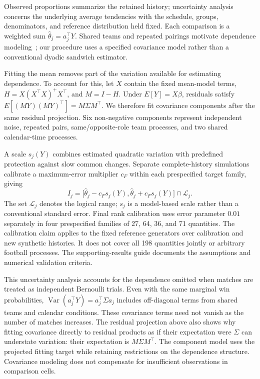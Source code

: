 Observed proportions summarize the retained history; uncertainty analysis concerns the underlying average tendencies with the schedule, groups, denominators, and reference distribution held fixed. Each comparison is a weighted sum $\widehat\theta_j=a_j^\top Y$. Shared teams and repeated pairings motivate dependence modeling~\cite{aronow2015dyadic}; our procedure uses a specified covariance model rather than a conventional dyadic sandwich estimator.

Fitting the mean removes part of the variation available for estimating dependence. To account for this, let $X$ contain the fixed mean-model terms, $H=X(X^\top X)^+X^\top$, and $M=I-H$. Under $E[Y]=X\beta$, residuals satisfy $E[(MY)(MY)^\top]=M\Sigma M^\top$. We therefore fit covariance components after the same residual projection. Six non-negative components represent independent noise, repeated pairs, same/opposite-role team processes, and two shared calendar-time processes.

A scale $s_j(Y)$ combines estimated quadratic variation with predefined protection against slow common changes. Separate complete-history simulations calibrate a maximum-error multiplier $c_F$ within each prespecified target family, giving
\begin{equation}
 I_j=\bigl[\widehat\theta_j-c_Fs_j(Y),\widehat\theta_j+c_Fs_j(Y)\bigr]\cap\mathcal L_j.
 \label{eq:conditional-envelope}
\end{equation}
The set $\mathcal L_j$ denotes the logical range; $s_j$ is a model-based scale rather than a conventional standard error. Final rank calibration uses error parameter $0.01$ separately in four prespecified families of 27, 64, 36, and 71 quantities. The calibration claim applies to the fixed reference generators over calibration and new synthetic histories. It does not cover all 198 quantities jointly or arbitrary football processes. The supporting-results guide documents the assumptions and numerical validation criteria.

This uncertainty analysis accounts for the dependence omitted when matches are treated as independent Bernoulli trials. Even with the same marginal win probabilities, $\operatorname{Var}(a_j^\top Y)=a_j^\top\Sigma a_j$ includes off-diagonal terms from shared teams and calendar conditions. These covariance terms need not vanish as the number of matches increases. The residual projection above also shows why fitting covariance directly to residual products as if their expectation were $\Sigma$ can understate variation: their expectation is $M\Sigma M^\top$. The component model uses the projected fitting target while retaining restrictions on the dependence structure. Covariance modeling does not compensate for insufficient observations in comparison cells.

